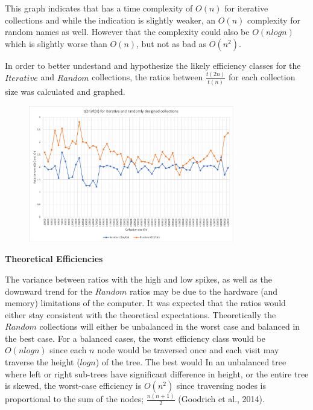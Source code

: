 \documentclass[a4paper]{article}
\begin{document}
This graph indicates that  has a time complexity of $O(n)$ for iterative collections and while the indication is slightly weaker, an $O(n)$ complexity for random names as well. However that the complexity could also be $O(nlogn)$ which is slightly worse than $O(n)$, but not as bad as $O(n^2)$. 
\vspace{3mm}

\noindent
In order to better undestand and hypothesize the likely efficiency classes for the $Iterative$ and $Random$ collections, the ratios between $\frac{t(2n)}{t(n)}$ for each collection size was calculated and graphed.
\vspace{3mm}

\begin{figure}[H]
    \centering
    \includegraphics[width=0.8\textwidth]{data/graph_ratios.png}
\end{figure}

\noindent
\textbf{Theoretical Efficiencies}

\noindent
The variance between ratios with the high and low spikes, as  well as the downward trend for the $Random$ ratios may be due to the hardware (and memory) limitations of the computer. It was expected that the ratios would either stay consistent with the theoretical expectations. Theoretically the $Random$ collections will either be unbalanced in the worst case and balanced in the best case. For a balanced cases, the worst efficiency class would be $O(nlogn)$ since each $n$ node would be traversed once and each visit may traverse the height ($logn$) of the tree. The best would  In an unbalanced tree where left or right sub-trees have significant difference in height, or the entire tree is skewed, the worst-case efficiency is $O(n^2)$ since traversing nodes is proportional to the sum of the nodes; $\frac{n(n+1)}{2}$ (Goodrich et al., 2014). 
\vspace{3mm}
\end{document}
